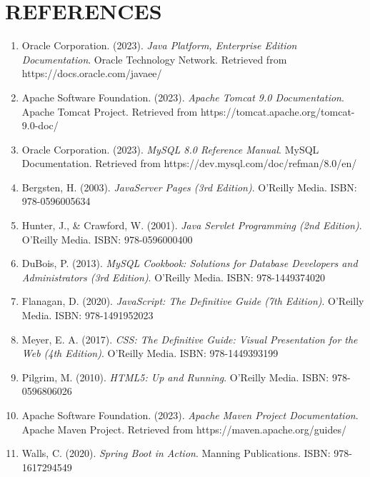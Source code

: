 \chapter*{REFERENCES}

\begin{enumerate}

\item Oracle Corporation. (2023). \textit{Java Platform, Enterprise Edition Documentation}. Oracle Technology Network. Retrieved from https://docs.oracle.com/javaee/

\item Apache Software Foundation. (2023). \textit{Apache Tomcat 9.0 Documentation}. Apache Tomcat Project. Retrieved from https://tomcat.apache.org/tomcat-9.0-doc/

\item Oracle Corporation. (2023). \textit{MySQL 8.0 Reference Manual}. MySQL Documentation. Retrieved from https://dev.mysql.com/doc/refman/8.0/en/

\item Bergsten, H. (2003). \textit{JavaServer Pages (3rd Edition)}. O'Reilly Media. ISBN: 978-0596005634

\item Hunter, J., \& Crawford, W. (2001). \textit{Java Servlet Programming (2nd Edition)}. O'Reilly Media. ISBN: 978-0596000400

\item DuBois, P. (2013). \textit{MySQL Cookbook: Solutions for Database Developers and Administrators (3rd Edition)}. O'Reilly Media. ISBN: 978-1449374020

\item Flanagan, D. (2020). \textit{JavaScript: The Definitive Guide (7th Edition)}. O'Reilly Media. ISBN: 978-1491952023

\item Meyer, E. A. (2017). \textit{CSS: The Definitive Guide: Visual Presentation for the Web (4th Edition)}. O'Reilly Media. ISBN: 978-1449393199

\item Pilgrim, M. (2010). \textit{HTML5: Up and Running}. O'Reilly Media. ISBN: 978-0596806026

\item Apache Software Foundation. (2023). \textit{Apache Maven Project Documentation}. Apache Maven Project. Retrieved from https://maven.apache.org/guides/

\item Walls, C. (2020). \textit{Spring Boot in Action}. Manning Publications. ISBN: 978-1617294549


\end{enumerate}
